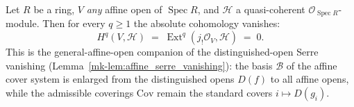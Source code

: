 \begin{lemma}\label{mk-lem:affine_serre_vanishing_general_open}
  \leanok

  Let \(R\) be a ring, \(V\) \emph{any} affine open of \(\operatorname{Spec} R\), and
  \(\mathcal{H}\) a quasi-coherent \(\mathcal{O}_{\operatorname{Spec} R}\)-module. Then for every
  \(q \geq 1\) the absolute cohomology vanishes:
  \[
    H^q(V, \mathcal{H}) \;=\; \operatorname{Ext}^q(j_!\mathcal{O}_V, \mathcal{H}) \;=\; 0.
  \]
  This is the general-affine-open companion of the distinguished-open Serre vanishing
  (Lemma~\ref{mk-lem:affine_serre_vanishing}): the basis \(\mathcal{B}\) of the affine cover system is
  enlarged from the distinguished opens \(D(f)\) to all affine opens, while the admissible coverings
  \(\mathrm{Cov}\) remain the standard covers \(i \mapsto D(g_i)\).
\end{lemma}

